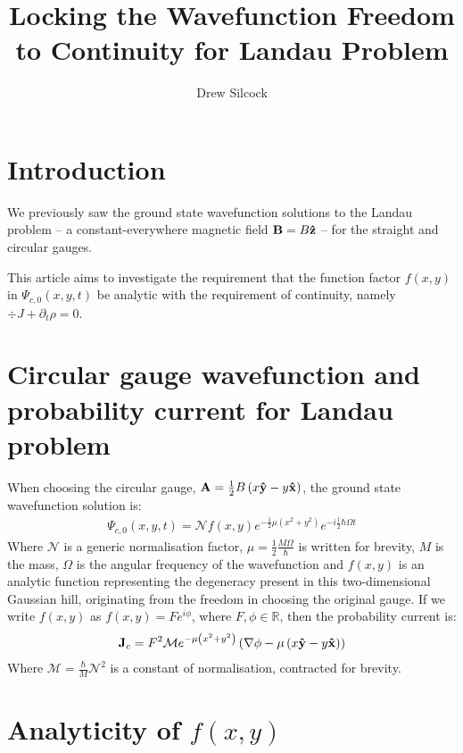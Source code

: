 \documentclass{article}
\title{Locking the Wavefunction Freedom to Continuity for Landau Problem}
\author{Drew Silcock}
\begin{document}
\maketitle

\section{Introduction}

We previously saw the ground state wavefunction solutions to the Landau problem
-- a constant-everywhere magnetic field $\mathbf{B} = B\mathbf{ \hat{ z }}$ -- for the
straight and circular gauges.

This article aims to investigate the requirement that the function factor
$f(x,y)$ in $\Psi_{c,0}(x,y,t)$ be analytic with the requirement of continuity,
namely $\div{J} + \partial_t \rho = 0$.

\section{Circular gauge wavefunction and probability current for Landau problem}

When choosing the circular gauge, $\mathbf{A} = \frac{1}{2} B \left( x\mathbf{ \hat{ y }}
- y\mathbf{ \hat{ x }} \right)$, the ground state wavefunction solution is:
\begin{align}
    \Psi_{c,0}(x,y,t) = \mathcal{N} f(x,y)
    e^{- \frac{1}{2} \mu \left( x^2 + y^2 \right)} e^{-i \frac{1}{2} \hbar
    \Omega t}
\end{align}
Where $\mathcal{N}$ is a generic normalisation factor, $\mu = \frac{1}{2} \frac{M
\Omega}{\hbar}$ is written for brevity, $M$ is the mass, $\Omega$ is the angular
frequency of the wavefunction and $f(x,y)$ is an analytic function representing
the degeneracy present in this two-dimensional Gaussian hill, originating from
the freedom in choosing the original gauge. If we write $f(x,y)$ as $f(x,y) =
F e^{i \phi}$, where $F, \phi \in \mathbb{R}$, then the probability current is:
\begin{align}
    \mathbf{J}_c = F^2 \mathcal{M} e^{- \mu \left(
        x^2 + y^2 \right)} \left( \nabla \phi - \mu \left( x \mathbf{ \hat{ y }}
        - y \mathbf{ \hat{ x }} \right) \right)
\end{align}
Where $\mathcal{M} = \frac{\hbar}{M} \mathcal{N}^2$ is a constant of
normalisation, contracted for brevity.

\section{Analyticity of $f(x,y)$}
\end{document}
